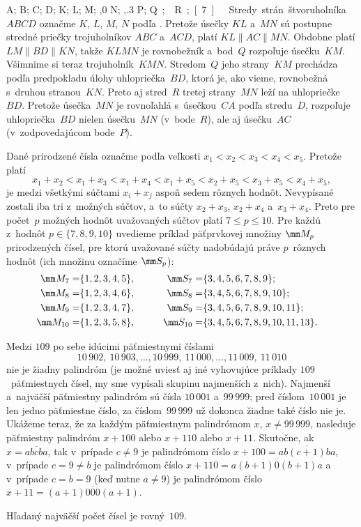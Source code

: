 {%
\fontplace
\tpoint A; \tpoint B; \lpoint C; \bpoint D;
\tpoint K; \tpoint L; \lbpoint M; \bpoint{},0 N;
\ltpoint{},.3 P; \lBpoint\down\unit Q; \lbpoint R;
[7] \hfil\Obr

Stredy strán štvoruholníka~$ABCD$ označme $K$, $L$, $M$, $N$ podľa
\obr.
\inspicture{}
Pretože úsečky $KL$ a~$MN$ sú postupne stredné priečky trojuholníkov
$ABC$ a~$ACD$, platí $KL\parallel AC\parallel MN$. Obdobne
platí $LM\parallel BD\parallel KN$, takže $KLMN$ je rovnobežník 
a~bod~$Q$ rozpoľuje úsečku~$KM$. Všimnime si teraz trojuholník~$KMN$. Stredom~$Q$
jeho strany~$KM$ prechádza podľa predpokladu úlohy uhlopriečka~$BD$,
ktorá je, ako vieme, rovnobežná s~druhou stranou~$KN$. Preto
aj stred~$R$ tretej strany~$MN$ leží na uhlopriečke~$BD$. Pretože
úsečka~$MN$ je rovnoľahlá s~úsečkou~$CA$ podľa stredu~$D$, rozpoľuje
uhlopriečka~$BD$ nielen úsečku~$MN$ (v~bode~$R$), ale aj úsečku~$AC$
(v~zodpovedajúcom bode~$P$).}

{%
Dané prirodzené čísla označme podľa veľkosti
$x_1<x_2<x_3<x_4<x_5$. Pretože platí
$$
x_1+x_2<x_1+x_3<x_1+x_4<x_1+x_5<
x_2+x_5<x_3+x_5<x_4+x_5,
$$
je medzi všetkými súčtami $x_i+x_j$ aspoň sedem rôznych hodnôt.
Nevypísané zostali iba tri z~možných súčtov, a~to súčty
$x_2+x_3$, $x_2+x_4$ a~$x_3+x_4$. Preto pre počet~$p$ možných hodnôt
uvažovaných súčtov platí $7\le p\le 10$.
Pre každú z~hodnôt
$p\in\{7,8,9,10\}$ uvedieme príklad päťprvkovej množiny $\mm M_p$
prirodzených čísel, pre ktorú uvažované súčty nadobúdajú práve $p$~rôznych
hodnôt (ich množinu označíme $\mm S_p$):
$$
\aligned
\mm M_7=&\{1,2,3,4,5\},\cr
\mm M_8=&\{1,2,3,4,6\},\cr
\mm M_9=&\{1,2,3,4,7\},\cr
\mm M_{10}=&\{1,2,3,5,8\},
\endaligned \qquad
\aligned
   \mm S_7=&\{3,4,5,6,7,8,9\};\cr
   \mm S_8=&\{3,4,5,6,7,8,9,10\};\cr
   \mm S_9=&\{3,4,5,6,7,8,9,10,11\};\cr
\mm S_{10}=&\{3,4,5,6,7,8,9,10,11,13\}.\cr
\endaligned
$$}

{%
Medzi $109$ po sebe idúcimi päťmiestnymi číslami
$$
10\,902,\ 10\,903,\dots, 10\,999,\  11\,000,\dots,
11\,009,\ 11\,010
$$
nie je žiadny palindróm (je možné uviesť aj iné vyhovujúce
príklady $109$~päťmiestnych čísel,
my sme vypísali skupinu najmenších z~nich).
Najmenší a~najväčší päťmiestny palindróm sú čísla $10\,001$
a~$99\,999$; pred číslom~$10\,001$ je len jedno päťmiestne číslo,
za číslom~$99\,999$ už dokonca žiadne také číslo nie je. Ukážeme
teraz, že za každým päťmiestnym palindrómom
$x$, $x\ne99\,999$,
nasleduje päťmiestny palindróm $x+100$ alebo $x+110$ alebo $x+11$.
Skutočne, ak $x=\overline{abcba}$, tak v~prípade $c\ne9$
je palindrómom číslo $x+100=\overline{ab(c+1)ba}$, v~prípade $c=9\ne b$
je palindrómom číslo $x+110=\overline{a(b+1)0(b+1)a}$ a v~prípade $c=b=9$
(keď nutne $a\ne9$) je palindrómom číslo
$x+11=\overline{(a+1)000(a+1)}$.

\odpoved
Hľadaný najväčší počet čísel je rovný~$109$.}

